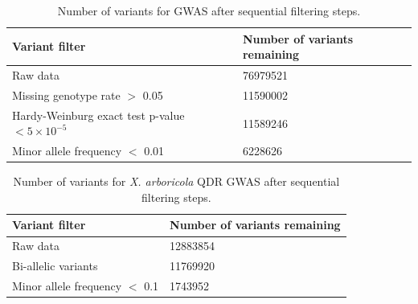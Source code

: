 \documentclass[11pt]{article}
\begin{document}
\begin{table}[H]
\caption{Number of variants for GWAS after sequential filtering steps.}
	\begin{tabularx}{\linewidth}{XX}
	\hline
	Variant filter & Number of variants remaining \\
	\hline 
	Raw data & 76979521 \\
	Missing genotype rate $>$ 0.05 & 11590002 \\
	Hardy-Weinburg exact test p-value $< 5 \times 10^{-5}$ & 11589246 \\
	Minor allele frequency $<$ 0.01 & 6228626 \\ \hline			
	\end{tabularx}
	\label{tab:variant-filtering}
\end{table}

\begin{table}[H]
\caption{Number of variants for \emph{X. arboricola} QDR GWAS after sequential filtering steps.}
	\begin{tabularx}{\linewidth}{XX}
	\hline
	Variant filter & Number of variants remaining \\
	\hline 
	Raw data & 12883854 \\
	Bi-allelic variants & 11769920 \\
	Minor allele frequency $<$ 0.1 & 1743952 \\ \hline
	\end{tabularx}
	\label{tab:variant-filtering-plants}
\end{table}

\stopsection
\end{document}
